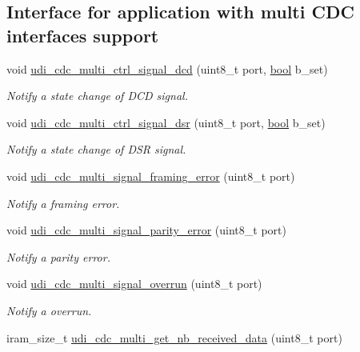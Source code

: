 \subsection*{Interface for application with multi C\-D\-C interfaces support}
\begin{DoxyCompactItemize}
\item 
void \hyperlink{group__udi__cdc__group_ga15a1ee3d8fde1f2687b9ffb93cfa16b4}{udi\-\_\-cdc\-\_\-multi\-\_\-ctrl\-\_\-signal\-\_\-dcd} (uint8\-\_\-t port, \hyperlink{group__group__xmega__utils_ga97a80ca1602ebf2303258971a2c938e2}{bool} b\-\_\-set)
\begin{DoxyCompactList}\small\item\em Notify a state change of D\-C\-D signal. \end{DoxyCompactList}\item 
void \hyperlink{group__udi__cdc__group_ga5b9248dde2e26a04bf1915da8531ed4f}{udi\-\_\-cdc\-\_\-multi\-\_\-ctrl\-\_\-signal\-\_\-dsr} (uint8\-\_\-t port, \hyperlink{group__group__xmega__utils_ga97a80ca1602ebf2303258971a2c938e2}{bool} b\-\_\-set)
\begin{DoxyCompactList}\small\item\em Notify a state change of D\-S\-R signal. \end{DoxyCompactList}\item 
void \hyperlink{group__udi__cdc__group_gaeb3ad676fa423d7be61886397c5b5954}{udi\-\_\-cdc\-\_\-multi\-\_\-signal\-\_\-framing\-\_\-error} (uint8\-\_\-t port)
\begin{DoxyCompactList}\small\item\em Notify a framing error. \end{DoxyCompactList}\item 
void \hyperlink{group__udi__cdc__group_ga7c6d996cf1697fdcbb0e6dfae3de701d}{udi\-\_\-cdc\-\_\-multi\-\_\-signal\-\_\-parity\-\_\-error} (uint8\-\_\-t port)
\begin{DoxyCompactList}\small\item\em Notify a parity error. \end{DoxyCompactList}\item 
void \hyperlink{group__udi__cdc__group_ga79edbdac74537196ef0afd4263a7e9cc}{udi\-\_\-cdc\-\_\-multi\-\_\-signal\-\_\-overrun} (uint8\-\_\-t port)
\begin{DoxyCompactList}\small\item\em Notify a overrun. \end{DoxyCompactList}\item 
iram\-\_\-size\-\_\-t \hyperlink{group__udi__cdc__group_ga733e450aa820ee812aac0ba101886afe}{udi\-\_\-cdc\-\_\-multi\-\_\-get\-\_\-nb\-\_\-received\-\_\-data} (uint8\-\_\-t port)

\end{DoxyCompactItemize}
